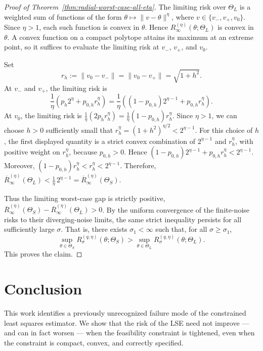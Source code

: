 \documentclass[11pt]{article}
\theoremstyle{plain}
\theoremstyle{definition}
\begin{document}
\begin{proof}[Proof of Theorem~\ref{thm:radial-worst-case-all-eta}]
The limiting risk over $\Theta_L$ is a weighted sum of functions of the form
$\theta\mapsto \|v-\theta\|^\eta$, where
$v\in\{v_-,v_+,v_0\}$. Since $\eta>1$, each such function is convex in
$\theta$. Hence $R_{\infty}^{(\eta)}(\theta;\Theta_L)$ is convex in
$\theta$. A convex function on a compact polytope attains its maximum at an
extreme point, so it suffices to evaluate the limiting risk at
$v_-$, $v_+$, and $v_0$.

Set
\[
    r_h:=\|v_0-v_-\|=\|v_0-v_+\|=\sqrt{1+h^2}.
\]
At $v_-$ and $v_+$, the limiting risk is
\[
    \frac1\eta\left(p_h 2^\eta+p_{0,h}r_h^\eta\right)
    =
    \frac1\eta
    \left((1-p_{0,h})2^{\eta-1}+p_{0,h}r_h^\eta\right).
\]
At $v_0$, the limiting risk is $\frac1\eta\left(2p_h r_h^\eta\right)
    =
    \frac1\eta (1-p_{0,h})r_h^\eta$.
Since $\eta>1$, we can choose $h>0$ sufficiently small that $r_h^\eta=(1+h^2)^{\eta/2}<2^{\eta-1}$.  For this choice of $h$, the first displayed quantity is a strict convex
combination of $2^{\eta-1}$ and $r_h^\eta$, with positive weight on
$r_h^\eta$, because $p_{0,h}>0$. Hence $(1-p_{0,h})2^{\eta-1}+p_{0,h}r_h^\eta < 2^{\eta-1}$. Moreover, $ (1-p_{0,h})r_h^\eta
    <
    r_h^\eta
    <
    2^{\eta-1}$. Therefore, $\overline R_{\infty}^{(\eta)}(\Theta_L)
    <
    \frac1\eta\,2^{\eta-1}
    =
    \overline R_{\infty}^{(\eta)}(\Theta_S)$.

Thus the limiting worst-case gap is strictly positive, $\overline R_{\infty}^{(\eta)}(\Theta_S)
    -
    \overline R_{\infty}^{(\eta)}(\Theta_L)
    >0$. By the uniform convergence of the finite-noise risks to their diverging-noise
limits, the same strict inequality persists for all sufficiently large
$\sigma$. That is, there exists $\sigma_1<\infty$ such that, for all
$\sigma\ge\sigma_1$,
\[
    \sup_{\theta\in\Theta_S}
    R_{\sigma}^{(q,\eta)}(\theta;\Theta_S)
    >
    \sup_{\theta\in\Theta_L}
    R_{\sigma}^{(q,\eta)}(\theta;\Theta_L).
\]
This proves the claim.
\end{proof}



\section{Conclusion}
This work identifies a previously unrecognized failure mode of the constrained least squares estimator. We show that the risk of the LSE need not improve --- and can in fact worsen --- when the feasibility constraint is tightened, even when the constraint is compact, convex, and correctly specified. 
\end{document}
